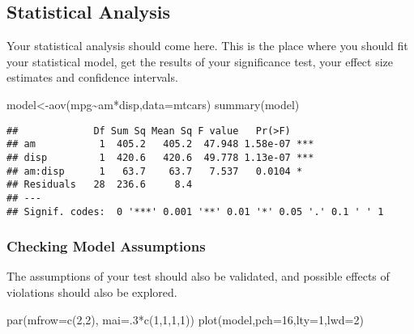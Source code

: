 \documentclass[
]{article}
\newenvironment{Shaded}{\begin{snugshade}}{\end{snugshade}}
\newcommand{\AttributeTok}[1]{\textcolor[rgb]{0.77,0.63,0.00}{#1}}
\newcommand{\DecValTok}[1]{\textcolor[rgb]{0.00,0.00,0.81}{#1}}
\newcommand{\FunctionTok}[1]{\textcolor[rgb]{0.00,0.00,0.00}{#1}}
\newcommand{\NormalTok}[1]{#1}
\newcommand{\OtherTok}[1]{\textcolor[rgb]{0.56,0.35,0.01}{#1}}
\newcommand{\SpecialCharTok}[1]{\textcolor[rgb]{0.00,0.00,0.00}{#1}}
\begin{document}
\hypertarget{statistical-analysis}{%
\subsection{Statistical Analysis}\label{statistical-analysis}}

Your statistical analysis should come here. This is the place where you
should fit your statistical model, get the results of your significance
test, your effect size estimates and confidence intervals.

\begin{Shaded}
\begin{Highlighting}[]
\NormalTok{model}\OtherTok{\textless{}{-}}\FunctionTok{aov}\NormalTok{(mpg}\SpecialCharTok{\textasciitilde{}}\NormalTok{am}\SpecialCharTok{*}\NormalTok{disp,}\AttributeTok{data=}\NormalTok{mtcars)}
\FunctionTok{summary}\NormalTok{(model)}
\end{Highlighting}
\end{Shaded}

\begin{verbatim}
##             Df Sum Sq Mean Sq F value   Pr(>F)    
## am           1  405.2   405.2  47.948 1.58e-07 ***
## disp         1  420.6   420.6  49.778 1.13e-07 ***
## am:disp      1   63.7    63.7   7.537   0.0104 *  
## Residuals   28  236.6     8.4                     
## ---
## Signif. codes:  0 '***' 0.001 '**' 0.01 '*' 0.05 '.' 0.1 ' ' 1
\end{verbatim}

\hypertarget{checking-model-assumptions}{%
\subsubsection{Checking Model
Assumptions}\label{checking-model-assumptions}}

The assumptions of your test should also be validated, and possible
effects of violations should also be explored.

\begin{Shaded}
\begin{Highlighting}[]
\FunctionTok{par}\NormalTok{(}\AttributeTok{mfrow=}\FunctionTok{c}\NormalTok{(}\DecValTok{2}\NormalTok{,}\DecValTok{2}\NormalTok{), }\AttributeTok{mai=}\NormalTok{.}\DecValTok{3}\SpecialCharTok{*}\FunctionTok{c}\NormalTok{(}\DecValTok{1}\NormalTok{,}\DecValTok{1}\NormalTok{,}\DecValTok{1}\NormalTok{,}\DecValTok{1}\NormalTok{))}
\FunctionTok{plot}\NormalTok{(model,}\AttributeTok{pch=}\DecValTok{16}\NormalTok{,}\AttributeTok{lty=}\DecValTok{1}\NormalTok{,}\AttributeTok{lwd=}\DecValTok{2}\NormalTok{)}
\end{Highlighting}
\end{Shaded}
\end{document}
